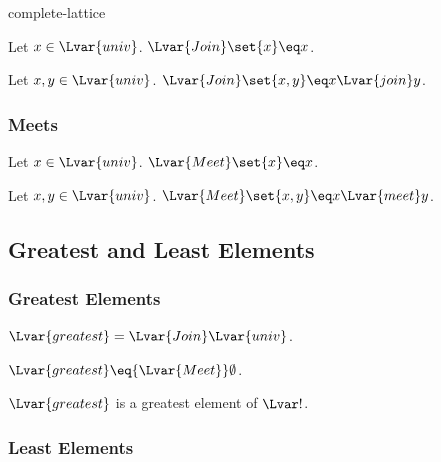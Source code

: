 \documentclass{stex}
\begin{document}
\begin{smodule}{complete-lattice}
\begin{proposition*}[forthel,id=JoinOfSingletonThm,printid]
  Let $x\in\Lvar{univ}$.
  ${\Lvar{Join}}\set{x}\eq x$.
\end{proposition*}

\begin{proposition*}[forthel,id=JoinOfPairThm,printid]
  Let $x,y\in\Lvar{univ}$.
  ${\Lvar{Join}}\set{x,y}\eq x{\Lvar{join}}y$.
\end{proposition*}

\subsubsection{Meets}

\begin{proposition*}[forthel,id=MeetOfSingletonThm,printid]
  Let $x\in\Lvar{univ}$.
  ${\Lvar{Meet}}\set{x}\eq x$.
\end{proposition*}

\begin{proposition*}[forthel,id=MeetOfPairThm,printid]
  Let $x,y\in\Lvar{univ}$.
  ${\Lvar{Meet}}\set{x,y}\eq x{\Lvar{meet}}y$.
\end{proposition*}

\subsection{Greatest and Least Elements}

\subsubsection{Greatest Elements}

\begin{definition*}[forthel,id=CompleteLatticeGreatestDef,printid]
  ${\Lvar{greatest}}={\Lvar{Join}}\Lvar{univ}$.
\end{definition*}

\begin{proposition*}[forthel,id=GreatestIsMeetOfEmptystThm,printid]
  ${\Lvar{greatest}}\eq{\Lvar{Meet}}\emptyset$.
\end{proposition*}

\begin{proposition*}[forthel,id=GreatestIsGreatestElement,printid]
  ${\Lvar{greatest}}$ is a greatest element of $\Lvar!$.
\end{proposition*}

\subsubsection{Least Elements}


\end{smodule}
\end{document}
